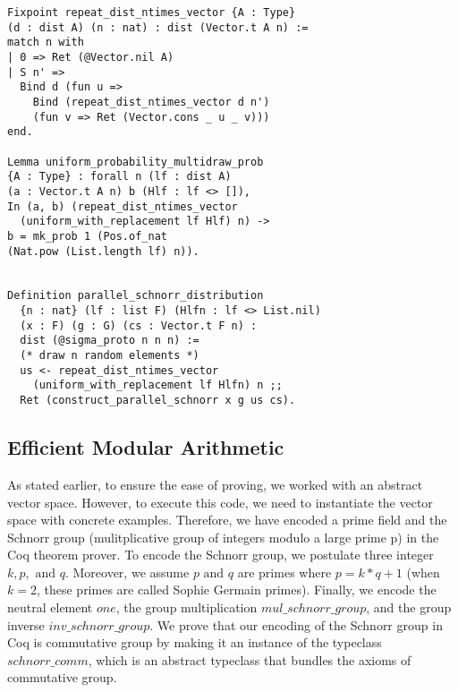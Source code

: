 \documentclass[conference,compsoc]{IEEEtran}
\begin{document}
\begin{lstlisting}[frame=single, language=Coq, caption={Definition of Natural Number},
label={ind_nat},captionpos=t, basicstyle=\ttfamily\footnotesize,
abovecaptionskip=-\medskipamount]
Fixpoint repeat_dist_ntimes_vector {A : Type} 
(d : dist A) (n : nat) : dist (Vector.t A n) := 
match n with 
| 0 => Ret (@Vector.nil A)
| S n' => 
  Bind d (fun u => 
    Bind (repeat_dist_ntimes_vector d n')
    (fun v => Ret (Vector.cons _ u _ v)))
end.

Lemma uniform_probability_multidraw_prob 
{A : Type} : forall n (lf : dist A) 
(a : Vector.t A n) b (Hlf : lf <> []), 
In (a, b) (repeat_dist_ntimes_vector 
  (uniform_with_replacement lf Hlf) n) ->
b = mk_prob 1 (Pos.of_nat 
(Nat.pow (List.length lf) n)).


Definition parallel_schnorr_distribution  
  {n : nat} (lf : list F) (Hlfn : lf <> List.nil) 
  (x : F) (g : G) (cs : Vector.t F n) : 
  dist (@sigma_proto n n n) :=
  (* draw n random elements *)
  us <- repeat_dist_ntimes_vector 
    (uniform_with_replacement lf Hlfn) n ;;
  Ret (construct_parallel_schnorr x g us cs).
\end{lstlisting}


\subsection{Efficient Modular Arithmetic}
As stated earlier, to ensure the ease of proving, we worked with 
an abstract vector space. However, to execute this code, we need to 
instantiate the vector space with concrete examples. Therefore, we have 
encoded a prime field and the Schnorr group \cite{schnorr1991efficient} (mulitplicative 
group of integers modulo a large prime p) in the Coq theorem prover. 
To encode the Schnorr group, we postulate three integer $k, p, \text{ and } q$. 
Moreover, we assume $p \text{ and } q$ are primes where $p = k * q + 1$ (when 
$k = 2$, these primes are called Sophie Germain primes). Finally, 
we encode the neutral element $one$, the group multiplication $mul\_schnorr\_group$, 
and the group inverse $inv\_schnorr\_group$. We prove that our encoding 
of the Schnorr group in Coq is commutative group by making it 
an instance of the typeclass $schnorr\_comm$, 
which is an abstract typeclass that bundles the axioms 
of commutative group. 
\end{document}
